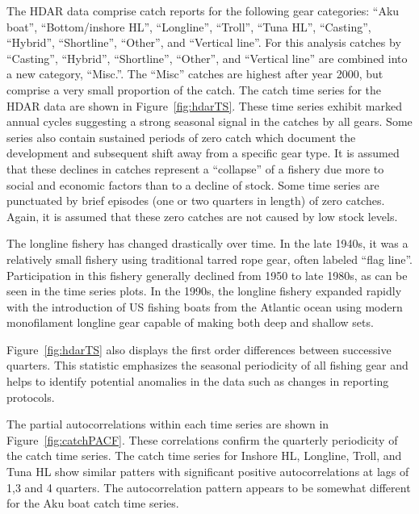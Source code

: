 \documentclass[12pt,letterpaper,twoside]{article}
\begin{document}




The HDAR data comprise catch reports for the following gear
categories:
``Aku boat'', ``Bottom/inshore HL'', ``Longline'',  ``Troll'', ``Tuna
HL'', ``Casting'', ``Hybrid'',  ``Shortline'', ``Other'', and
``Vertical line''.
For this analysis catches by ``Casting'', ``Hybrid'',
``Shortline'', ``Other'', and ``Vertical line'' are combined into a new
category, ``Misc.''. The ``Misc''
catches are highest after year 2000,
but comprise a very small proportion of the catch.
The catch time series for the HDAR data are shown in
Figure~\ref{fig:hdarTS}. These time
series exhibit marked annual cycles suggesting a strong seasonal
signal in the catches by all gears.
Some series also contain sustained periods of zero catch which
document the development and subsequent shift away from a specific
gear type. It is assumed that these declines in catches represent a
``collapse'' of a fishery due more to social and economic factors than
to a decline of stock.
Some time series are punctuated by brief episodes (one or two quarters in
length) of zero catches. Again, it is assumed that these zero catches
are not caused by low stock levels.

The longline fishery has changed drastically over time. In the late
1940s, it was a relatively small fishery using traditional
tarred rope gear, often labeled ``flag line''. 
Participation in this fishery generally declined from 1950 to
late 1980s, as can be seen in the time series plots. In the 1990s, the longline
fishery expanded rapidly with the introduction of US fishing boats
from the Atlantic ocean using modern monofilament longline gear
capable of making both deep and shallow sets.

Figure~\ref{fig:hdarTS} also displays the first order differences
between successive quarters. This statistic emphasizes the seasonal
periodicity of all fishing gear and helps to identify potential anomalies in
the data such as changes in reporting protocols. 

The partial autocorrelations within each time
series are shown in Figure~\ref{fig:catchPACF}. These correlations
confirm the quarterly periodicity  of the catch time series.
The catch time series for Inshore HL, Longline, Troll, and Tuna HL show
similar patters with
significant positive autocorrelations at lags of 1,3 and 4 quarters.
The autocorrelation pattern appears to be somewhat different for the Aku
boat catch time series.
\end{document}
